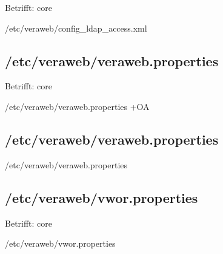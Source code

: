 \ifoa
Betrifft: core
\fi%

\begin{lstdump}{/etc/veraweb/config_ldap_access.xml}
\end{lstdump}

\ifoa

\subsection{/etc/veraweb/veraweb.properties}\label{subsec:refcfg-vw-vwprop}

Betrifft: core

\begin{lstdump}{/etc/veraweb/veraweb.properties +OA}
\end{lstdump}

\else%

\subsection{/etc/veraweb/veraweb.properties}\label{subsec:refcfg-vw-vwprop}

\begin{lstdump}{/etc/veraweb/veraweb.properties}
\end{lstdump}

\fi%

\subsection{/etc/veraweb/vwor.properties}\label{subsec:refcfg-vw-vworprop}

\ifoa
Betrifft: core
\fi%

\begin{lstdump}{/etc/veraweb/vwor.properties}
\end{lstdump}

\fi%
